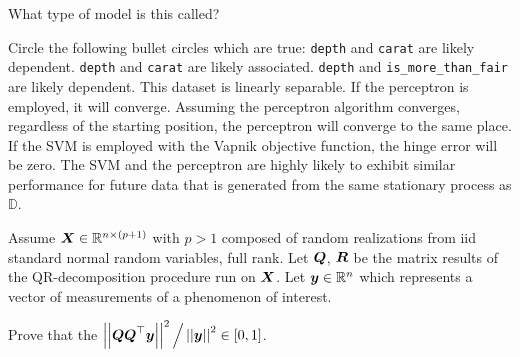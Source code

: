 \documentclass[12pt]{article}
\begin{document}
 What type of model is this called? 

Circle the following bullet circles which are true:
 \texttt{depth} and \texttt{carat} are likely dependent.  
 \texttt{depth} and \texttt{carat} are likely associated. 
 \texttt{depth} and \texttt{is\_more\_than\_fair} are likely dependent.  
 This dataset is linearly separable. 
 If the perceptron is employed, it will converge.  
 Assuming the perceptron algorithm converges, regardless of the starting position, the perceptron will converge to the same place.  
 If the SVM is employed with the Vapnik objective function, the hinge error will be zero. 
 The SVM and the perceptron are highly likely to exhibit similar performance for future data that is generated from the same stationary process as $\mathbb{D}$. 


\eenum
\pagebreak

\problem Assume $\boldsymbol{X} \in \mathbb{R}^{n \times (p+1)}$ with $p >1$ composed of random realizations from iid standard normal random variables, full rank. Let $\boldsymbol{Q}$, $\boldsymbol{R}$ be the matrix results of the QR-decomposition procedure run on $\boldsymbol{X}$. Let $\boldsymbol{y} \in \mathbb{R}^n$ which represents a vector of measurements of a phenomenon of interest.  %

\benum
{} Prove that the $\left|\left|\boldsymbol{Q}\boldsymbol{Q}^\top\boldsymbol{y}\right|\right|^2 \Big/ \left|\left|\boldsymbol{y}\right|\right|^2 \in \left[0,1\right]$.\\

\vspace{2cm}
\end{document}
